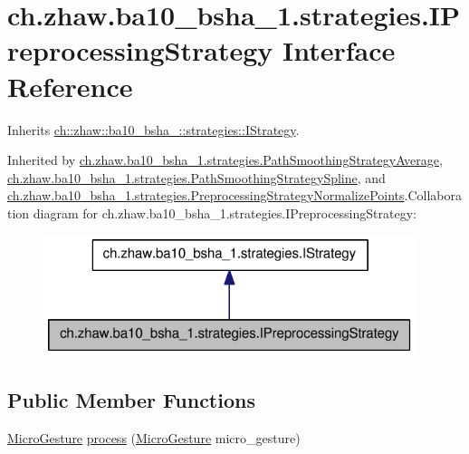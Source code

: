 \hypertarget{interfacech_1_1zhaw_1_1ba10__bsha__1_1_1strategies_1_1IPreprocessingStrategy}{
\section{ch.zhaw.ba10\_\-bsha\_\-1.strategies.IPreprocessingStrategy Interface Reference}
\label{interfacech_1_1zhaw_1_1ba10__bsha__1_1_1strategies_1_1IPreprocessingStrategy}
}


Inherits \hyperlink{interfacech_1_1zhaw_1_1ba10__bsha__1_1_1strategies_1_1IStrategy}{ch::zhaw::ba10\_\-bsha\_::strategies::IStrategy}.

Inherited by \hyperlink{classch_1_1zhaw_1_1ba10__bsha__1_1_1strategies_1_1PathSmoothingStrategyAverage}{ch.zhaw.ba10\_\-bsha\_\-1.strategies.PathSmoothingStrategyAverage}, \hyperlink{classch_1_1zhaw_1_1ba10__bsha__1_1_1strategies_1_1PathSmoothingStrategySpline}{ch.zhaw.ba10\_\-bsha\_\-1.strategies.PathSmoothingStrategySpline}, and \hyperlink{classch_1_1zhaw_1_1ba10__bsha__1_1_1strategies_1_1PreprocessingStrategyNormalizePoints}{ch.zhaw.ba10\_\-bsha\_\-1.strategies.PreprocessingStrategyNormalizePoints}.Collaboration diagram for ch.zhaw.ba10\_\-bsha\_\-1.strategies.IPreprocessingStrategy:\nopagebreak
\begin{figure}[H]
\begin{center}
\leavevmode
\includegraphics[width=308pt]{interfacech_1_1zhaw_1_1ba10__bsha__1_1_1strategies_1_1IPreprocessingStrategy__coll__graph}
\end{center}
\end{figure}
\subsection*{Public Member Functions}
\begin{DoxyCompactItemize}
\item 
\hyperlink{classch_1_1zhaw_1_1ba10__bsha__1_1_1service_1_1MicroGesture}{MicroGesture} \hyperlink{interfacech_1_1zhaw_1_1ba10__bsha__1_1_1strategies_1_1IPreprocessingStrategy_a3e3885dce8fda7b79dc514078f11ad62}{process} (\hyperlink{classch_1_1zhaw_1_1ba10__bsha__1_1_1service_1_1MicroGesture}{MicroGesture} micro\_\-gesture)
\end{DoxyCompactItemize}


